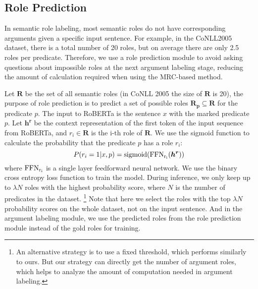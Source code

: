 \documentclass[11pt]{article}
\begin{document}
\subsection{Role Prediction}
\label{sec:role}
In semantic role labeling, most semantic roles do not have corresponding arguments given a specific input sentence. For example, in the CoNLL2005 dataset, there is a total number of 20 roles, but on average there are only 2.5 roles per predicate. Therefore, we use a role prediction module to avoid asking questions about impossible roles at the next argument labeling stage, reducing the amount of calculation required when using the MRC-based method.
\par
Let $\bm{R}$ be the set of all semantic roles (in CoNLL 2005 the size of $\bm{R}$ is 20), the purpose of role prediction is to predict a set of possible roles $\bm{R_p} \subseteq \bm{R}$ for the predicate $p$. The input to RoBERTa is the sentence $x$  with the marked predicate $p$. Let $\bm{h^r}$ be the context representation of the first token of the input sequence from RoBERTa, and $r_i\in \bm{R}$ is the i-th role of $\bm{R}$. We use the sigmoid function to calculate the probability that the predicate $p$ has a role $r_i$:
\begin{equation}
    P(r_i=1|x,p) = {\rm sigmoid}({\rm FFN_{r_i}}(\bm{h^r}))
\end{equation}
where ${\rm FFN_{r_i}}$ is a single layer feedforward  neural network. We use the binary cross entropy loss function to train the model. During inference, we only keep up to $\lambda N$
roles with the highest probability score,  where $N$ is the number of predicates in the dataset. 
\footnote{An alternative strategy is to use a fixed threshold, which performs similarly to ours. But our strategy can directly get the number of argument roles, which helps to analyze the amount of computation needed in argument labeling.}
Note that here we select the roles with the top $\lambda N$ probability scores on the whole dataset, not on the input sentence. And in the argument labeling module, we use the predicted roles from the role prediction module instead of the gold roles for training.
\end{document}

